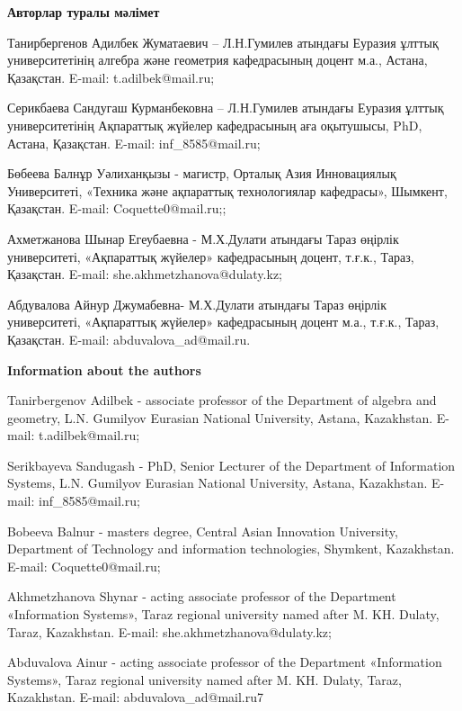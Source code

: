 {\bfseries Авторлар туралы мәлімет}

Танирбергенов Адилбек Жуматаевич -- Л.Н.Гумилев атындағы Еуразия ұлттық
университетінің алгебра және геометрия кафедрасының доцент м.а., Астана,
Қазақстан. E-mail: t.adilbek@mail.ru;

Серикбаева Сандугаш Курманбековна -- Л.Н.Гумилев атындағы Еуразия ұлттық
университетінің Ақпараттық жүйелер кафедрасының аға оқытушысы, PhD,
Астана, Қазақстан. E-mail: inf\_8585@mail.ru;

Бөбеева Балнұр Уәлиханқызы - магистр, Орталық Азия Инновациялық
Университеті, «Техника және ақпараттық технологиялар кафедрасы»,
Шымкент, Қазақстан. E-mail: Coquette0@mail.ru;;

Ахметжанова Шынар Егеубаевна - М.Х.Дулати атындағы Тараз өңірлік
университеті, «Ақпараттық жүйелер» кафедрасының доцент, т.ғ.к., Тараз,
Қазақстан. E-mail: she.akhmetzhanova@dulaty.kz;

Абдувалова Айнур Джумабевна- М.Х.Дулати атындағы Тараз өңірлік
университеті, «Ақпараттық жүйелер» кафедрасының доцент м.а., т.ғ.к.,
Тараз, Қазақстан. E-mail: abduvalova\_ad@mail.ru.

{\bfseries Information about the authors}

Tanirbergenov Adilbek - associate professor of the Department of algebra
and geometry, L.N. Gumilyov Eurasian National University, Astana,
Kazakhstan. E-mail: t.adilbek@mail.ru;

Serikbayeva Sandugash - PhD, Senior Lecturer of the Department of
Information Systems, L.N. Gumilyov Eurasian National University, Astana,
Kazakhstan. E-mail: inf\_8585@mail.ru;

Bobeeva Balnur - master\textquotesingle s degree, Central Asian
Innovation University, Department of Technology and information
technologies, Shymkent, Kazakhstan. E-mail: Coquette0@mail.ru;

Akhmetzhanova Shynar - acting associate professor of the Department
«Information Systems», Taraz regional university named after M. KH.
Dulaty, Taraz, Kazakhstan. E-mail: she.akhmetzhanova@dulaty.kz;

Abduvalova Ainur - acting associate professor of the Department
«Information Systems», Taraz regional university named after M. KH.
Dulaty, Taraz, Kazakhstan. E-mail: abduvalova\_ad@mail.ru7